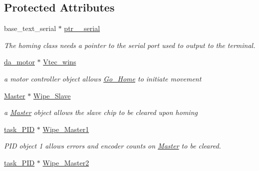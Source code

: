 \subsection*{Protected Attributes}
\begin{DoxyCompactItemize}
\item 
\hypertarget{class_go___home_aaf0a0c125f002315ced04f6a2520faff}{base\-\_\-text\-\_\-serial $\ast$ \hyperlink{class_go___home_aaf0a0c125f002315ced04f6a2520faff}{ptr\-\_\-\_\-serial}}\label{class_go___home_aaf0a0c125f002315ced04f6a2520faff}

\begin{DoxyCompactList}\small\item\em The homing class needs a pointer to the serial port used to output to the terminal. \end{DoxyCompactList}\item 
\hypertarget{class_go___home_a27906c7ed2cef0678fe85e7024252795}{\hyperlink{classda__motor}{da\-\_\-motor} $\ast$ \hyperlink{class_go___home_a27906c7ed2cef0678fe85e7024252795}{Vtec\-\_\-wins}}\label{class_go___home_a27906c7ed2cef0678fe85e7024252795}

\begin{DoxyCompactList}\small\item\em a motor controller object allows \hyperlink{class_go___home}{Go\-\_\-\-Home} to initiate movement \end{DoxyCompactList}\item 
\hypertarget{class_go___home_a43872cca289815689ac830135c3d58f1}{\hyperlink{class_master}{Master} $\ast$ \hyperlink{class_go___home_a43872cca289815689ac830135c3d58f1}{Wipe\-\_\-\-Slave}}\label{class_go___home_a43872cca289815689ac830135c3d58f1}

\begin{DoxyCompactList}\small\item\em a \hyperlink{class_master}{Master} object allows the slave chip to be cleared upon homing \end{DoxyCompactList}\item 
\hypertarget{class_go___home_a57ef328cc70eabbb8668c048aad96a8d}{\hyperlink{classtask___p_i_d}{task\-\_\-\-P\-I\-D} $\ast$ \hyperlink{class_go___home_a57ef328cc70eabbb8668c048aad96a8d}{Wipe\-\_\-\-Master1}}\label{class_go___home_a57ef328cc70eabbb8668c048aad96a8d}

\begin{DoxyCompactList}\small\item\em P\-I\-D object 1 allows errors and encoder counts on \hyperlink{class_master}{Master} to be cleared. \end{DoxyCompactList}\item 
\hypertarget{class_go___home_adf786b11550fc9149035ed7edc398133}{\hyperlink{classtask___p_i_d}{task\-\_\-\-P\-I\-D} $\ast$ \hyperlink{class_go___home_adf786b11550fc9149035ed7edc398133}{Wipe\-\_\-\-Master2}}\label{class_go___home_adf786b11550fc9149035ed7edc398133}


\end{DoxyCompactItemize}
